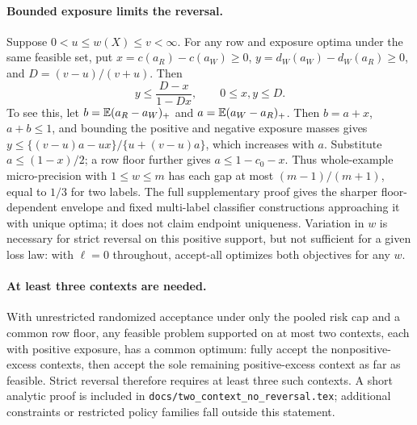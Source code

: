 \paragraph{Bounded exposure limits the reversal.}\label{app:bounded_exposure}
Suppose $0<u\leq w(X)\leq v<\infty$. For any row and exposure optima
under the same feasible set, put $x=c(a_R)-c(a_W)\geq0$,
$y=d_W(a_W)-d_W(a_R)\geq0$, and $D=(v-u)/(v+u)$. Then
\[
 y\leq\frac{D-x}{1-Dx},\qquad 0\leq x,y\leq D.
\]
To see this, let $b=\mathbb{E}(a_R-a_W)_+$ and $a=\mathbb{E}(a_W-a_R)_+$.
Then $b=a+x$, $a+b\leq1$, and bounding the positive and negative
exposure masses gives
$y\leq\{(v-u)a-ux\}/\{u+(v-u)a\}$, which increases with $a$.
Substitute $a\leq(1-x)/2$; a row floor further gives
$a\leq1-c_0-x$.
Thus whole-example micro-precision with $1\leq w\leq m$ has each
gap at most $(m-1)/(m+1)$, equal to $1/3$ for two labels.
The full supplementary proof gives the sharper floor-dependent envelope
and fixed multi-label classifier constructions approaching it with unique
optima; it does not claim endpoint uniqueness.
Variation in $w$ is necessary for strict reversal on this positive
support, but not sufficient for a given loss law: with $\ell=0$
throughout, accept-all optimizes both objectives for any $w$.

\paragraph{At least three contexts are needed.}
With unrestricted randomized acceptance under only the pooled risk cap and a common row floor, any feasible problem supported on at most two contexts, each with positive exposure, has a common optimum: fully accept the nonpositive-excess contexts, then accept the sole remaining positive-excess context as far as feasible. Strict reversal therefore requires at least three such contexts. A short analytic proof is included in \texttt{docs/two\_context\_no\_reversal.tex}; additional constraints or restricted policy families fall outside this statement.
